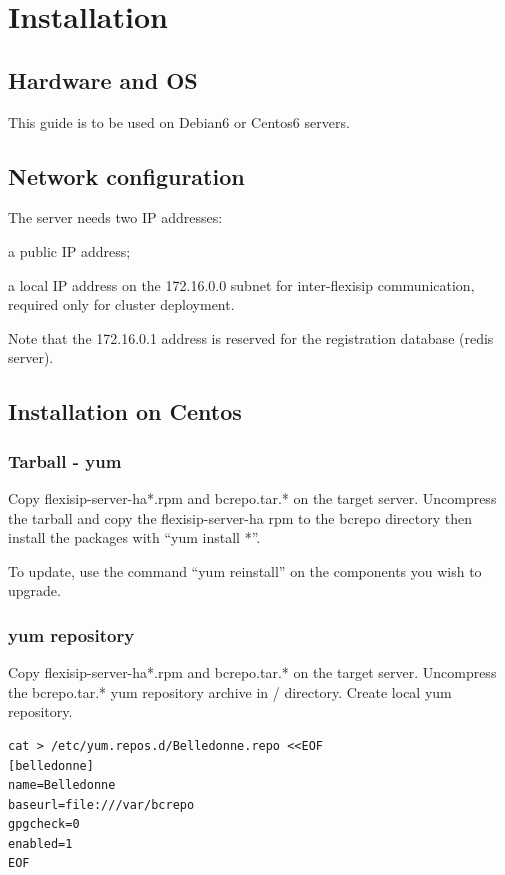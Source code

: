 \documentclass[a4paper,10pt]{article}
\begin{document}
\section{Installation}
\subsection{Hardware and OS}
This guide is to be used on Debian6 or Centos6 servers.


\subsection{Network configuration}
The server needs two IP addresses:
\begin{itemize*}
 \item a public IP address;
 \item a local IP address on the 172.16.0.0 subnet for inter-flexisip communication, required only for cluster deployment.
\end{itemize*}

Note that the 172.16.0.1 address is reserved for the registration database (redis server).


\subsection{Installation on Centos}
\subsubsection{Tarball - yum}
Copy flexisip-server-ha*.rpm and  bcrepo.tar.* on the target server.
Uncompress the tarball and copy the flexisip-server-ha rpm to the bcrepo directory then install the packages with “yum install *”.


To update, use the command “yum reinstall” on the components you wish to upgrade.


\subsubsection{yum repository}
Copy flexisip-server-ha*.rpm and  bcrepo.tar.* on the target server.
Uncompress the bcrepo.tar.* yum repository archive in / directory.
Create local yum repository.
\begin{verbatim}
cat > /etc/yum.repos.d/Belledonne.repo <<EOF
[belledonne]
name=Belledonne
baseurl=file:///var/bcrepo
gpgcheck=0
enabled=1
EOF
\end{verbatim}
\end{document}
